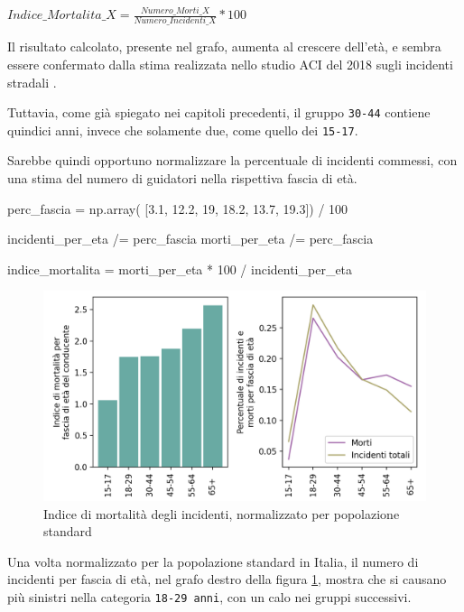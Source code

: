 \documentclass[a4paper,12pt]{report}
\newcommand{\columnstyle}[1]{\texttt{#1}}
\begin{document}
\begin{center}
    $Indice\_Mortalita\_X = \displaystyle \frac{Numero\_Morti\_X}{Numero\_Incidenti\_X} * 100$ 
\end{center}

Il risultato calcolato, presente nel grafo, aumenta al crescere dell'età, 
e sembra essere confermato dalla stima realizzata nello studio 
ACI del 2018 sugli incidenti stradali \cite{ACI:3}. 

Tuttavia, come già spiegato nei capitoli precedenti, il gruppo \columnstyle{30-44} 
contiene quindici anni, invece che solamente due, come quello dei \columnstyle{15-17}. 

Sarebbe quindi opportuno normalizzare la percentuale di incidenti commessi, 
con una stima del numero di guidatori nella rispettiva fascia di età. 

\begin{code}
perc_fascia = np.array( [3.1, 12.2, 19, 18.2, 13.7, 19.3]) / 100

incidenti_per_eta /= perc_fascia
morti_per_eta /= perc_fascia

indice_mortalita = morti_per_eta * 100 / incidenti_per_eta
\end{code}

\begin{figure}
    \includegraphics[width=\linewidth]{../src/incidenti/incidenti_senza_coords/mortalita/indice_mort_norm.png}
    \caption{Indice di mortalità degli incidenti, normalizzato per popolazione standard}
    \label{fig:indice-mort-norm}
\end{figure}

Una volta normalizzato per la popolazione standard in Italia, il numero di incidenti per 
fascia di età, nel grafo destro della figura \ref{fig:indice-mort-norm}, mostra che  
si causano più sinistri nella categoria \columnstyle{18-29 anni}, 
con un calo nei gruppi successivi. 
\end{document}
